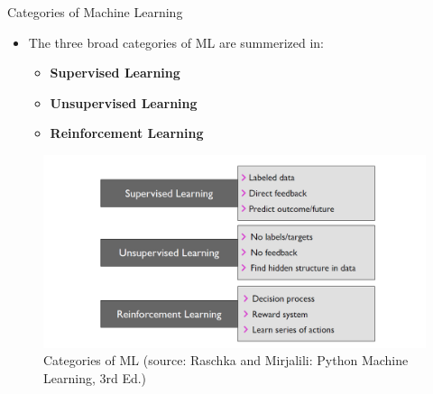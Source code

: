 \documentclass[compress,oilve]{beamer}
\begin{document}



\begin{frame}{Categories of Machine Learning}
\begin{itemize}
\item The three broad categories of ML are summerized in:
\begin{itemize}
\item \textbf{Supervised Learning}
\item \textbf{Unsupervised Learning}  
\item \textbf{Reinforcement Learning} 
\end{itemize}
\end{itemize}
\begin{figure}
\includegraphics[scale=0.5, right]{3}
\caption{Categories of ML (source: Raschka and Mirjalili: Python Machine Learning,
3rd Ed.)}
\end{figure}
\end{frame}
\end{document}
